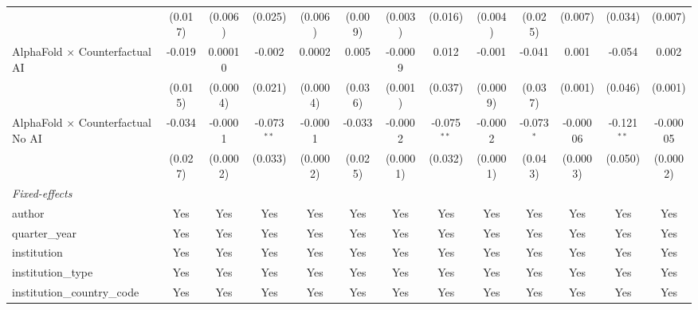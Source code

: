 \begin{tabular}{lcccccccccccc}
                                            & (0.017)       & (0.006)      & (0.025)       & (0.006)      & (0.009)      & (0.003)     & (0.016)       & (0.004)      & (0.025)      & (0.007)        & (0.034)       & (0.007)\\   
   AlphaFold $\times$ Counterfactual AI     & -0.019        & 0.00010      & -0.002        & 0.0002       & 0.005        & -0.0009     & 0.012         & -0.001       & -0.041       & 0.001          & -0.054        & 0.002\\   
                                            & (0.015)       & (0.0004)     & (0.021)       & (0.0004)     & (0.036)      & (0.001)     & (0.037)       & (0.0009)     & (0.037)      & (0.001)        & (0.046)       & (0.001)\\   
   AlphaFold $\times$ Counterfactual No AI  & -0.034        & -0.0001      & -0.073$^{**}$ & -0.0001      & -0.033       & -0.0002     & -0.075$^{**}$ & -0.0002      & -0.073$^{*}$ & -0.00006       & -0.121$^{**}$ & -0.00005\\   
                                            & (0.027)       & (0.0002)     & (0.033)       & (0.0002)     & (0.025)      & (0.0001)    & (0.032)       & (0.0001)     & (0.043)      & (0.0003)       & (0.050)       & (0.0002)\\   
   \midrule
   \emph{Fixed-effects}\\
   author                                   & Yes           & Yes          & Yes           & Yes          & Yes          & Yes         & Yes           & Yes          & Yes          & Yes            & Yes           & Yes\\  
   quarter\_year                            & Yes           & Yes          & Yes           & Yes          & Yes          & Yes         & Yes           & Yes          & Yes          & Yes            & Yes           & Yes\\  
   institution                              & Yes           & Yes          & Yes           & Yes          & Yes          & Yes         & Yes           & Yes          & Yes          & Yes            & Yes           & Yes\\  
   institution\_type                        & Yes           & Yes          & Yes           & Yes          & Yes          & Yes         & Yes           & Yes          & Yes          & Yes            & Yes           & Yes\\  
   institution\_country\_code               & Yes           & Yes          & Yes           & Yes          & Yes          & Yes         & Yes           & Yes          & Yes          & Yes            & Yes           & Yes\\  

\end{tabular}
